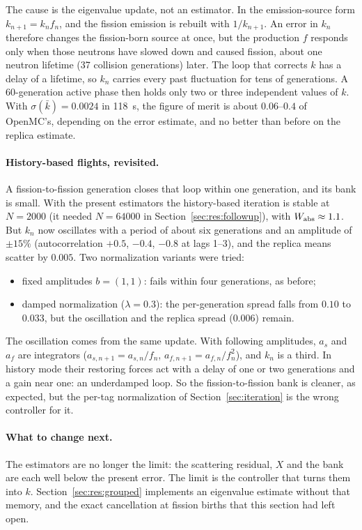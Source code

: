 The cause is the eigenvalue update, not an estimator. In the emission-source form
$k_{n+1}=k_nf_n$, and the fission emission is rebuilt with $1/k_{n+1}$. An error in $k_n$
therefore changes the fission-born source at once, but the production $f$ responds only when
those neutrons have slowed down and caused fission, about one neutron lifetime (37 collision
generations) later. The loop that corrects $k$ has a delay of a lifetime, so $k_n$ carries every
past fluctuation for tens of generations. A 60-generation active phase then holds only two or
three independent values of $k$. With $\sigma(\bar k)=0.0024$ in 118~s, the figure of merit
is about $0.06$--$0.4$ of OpenMC's, depending on the error estimate, and no better than before on
the replica estimate.

\paragraph{History-based flights, revisited.} A fission-to-fission generation closes that loop within
one generation, and its bank is small. With the present estimators the history-based iteration is
stable at $N=2000$ (it needed $N=64000$ in Section~\ref{sec:res:followup}), with
$W_{\mathrm{abs}}\approx1.1$. But $k_n$ now oscillates with a period of about six generations and an amplitude
of $\pm15\%$ (autocorrelation $+0.5$, $-0.4$, $-0.8$ at lags 1--3), and the replica means scatter by
$0.005$. Two normalization variants were tried:
\begin{itemize}
\item fixed amplitudes $b=(1,1)$: fails within four generations, as before;
\item damped normalization ($\lambda=0.3$): the per-generation spread falls from $0.10$ to $0.033$,
  but the oscillation and the replica spread ($0.006$) remain.
\end{itemize}
The oscillation comes from the same update. With following amplitudes, $a_{s}$ and $a_f$ are
integrators ($a_{s,n+1}=a_{s,n}/f_n$, $a_{f,n+1}=a_{f,n}/f_n^2$), and $k_n$ is a third. In history
mode their restoring forces act with a delay of one or two generations and a gain near one: an
underdamped loop. So the fission-to-fission bank is cleaner, as expected, but the per-tag
normalization of Section~\ref{sec:iteration} is the wrong controller for it.

\paragraph{What to change next.} The estimators are no longer the limit: the scattering residual,
$X$ and the bank are each well below the present error. The limit is the controller that turns
them into $k$. Section~\ref{sec:res:grouped} implements an eigenvalue estimate without that memory,
and the exact cancellation at fission births that this section had left open.

